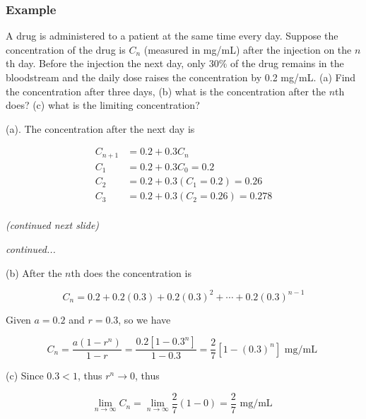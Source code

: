 \documentclass[t]{beamer}
\theoremstyle{plain}
\theoremstyle{definition}
\newcommand{\limm}[1]{\displaystyle \lim_{n\to #1}}
\begin{document}
\begin{frame}
\frametitle{Example}
A drug is administered to a patient at the same time every day.   Suppose the concentration of the drug is $C_n$ (measured in mg/mL) after the injection on the $n$th day.   Before the injection the next day,  only 3$0\%$ of the drug remains in the bloodstream and the daily dose raises the concentration by 0.2 mg/mL.  (a) Find the concentration after three days, (b) what is the concentration after the $n$th does? (c) what is the limiting concentration? \pause

\medskip

(a). The concentration after the next day is 

\begin{align*}
	C_{n+1} &= 0.2 + 0.3C_n\\
	C_1 &= 0.2 + 0.3C_0 = 0.2\\
	C_2 &= 0.2 + 0.3(C_1=0.2) = 0.26\\
	C_3 &= 0.2 + 0.3(C_2=0.26) = 0.278\\
\end{align*}

\textit{(continued next slide)}

\end{frame}

\begin{frame}
\textit{continued...}

(b) After the $n$th does the concentration is

$$C_n = 0.2 + 0.2(0.3) + 0.2(0.3)^2 + \cdots + 0.2(0.3)^{n-1}$$

Given $a = 0.2$ and $r = 0.3$, so we have

$$C_n = \frac{a(1 - r^n)}{1 - r} = \frac{0.2[1 - 0.3^n]}{1 - 0.3}=\frac{2}{7}[1 - (0.3)^n] \text{ mg/mL }$$

(c) Since $0.3 < 1$, thus $r^n \rightarrow 0$, thus

$$\limm{\infty} C_n = \limm{\infty}\frac{2}{7}(1 - 0) = \frac{2}{7} \text{ mg/mL }$$


\end{frame}
\end{document}
